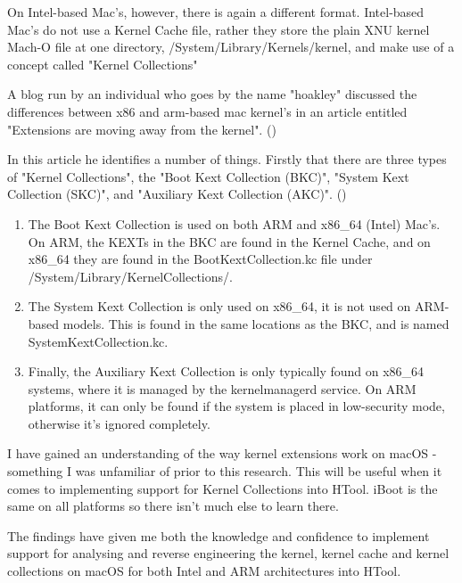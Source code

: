 On Intel-based Mac's, however, there is again a different format. Intel-based Mac's do not use a Kernel Cache file, rather they store the plain XNU kernel Mach-O file at one directory, /System/Library/Kernels/kernel, and make use of a concept called "Kernel Collections"

A blog run by an individual who goes by the name "hoakley" discussed the differences between x86 and arm-based mac kernel's in an article entitled "Extensions are moving away from the kernel". (\cite{hoakley-extensions-kernel})

In this article he identifies a number of things. Firstly that there are three types of "Kernel Collections", the "Boot Kext Collection (BKC)", "System Kext Collection (SKC)", and "Auxiliary Kext Collection (AKC)". (\cite{hoakley-extensions-kernel})

\begin{enumerate}
	\item The Boot Kext Collection is used on both ARM and x86\_64 (Intel) Mac's. On ARM, the KEXTs in the BKC are found in the Kernel Cache, and on x86\_64 they are found in the BootKextCollection.kc file under /System/Library/KernelCollections/.
	\item The System Kext Collection is only used on x86\_64, it is not used on ARM-based models. This is found in the same locations as the BKC, and is named SystemKextCollection.kc.
	\item Finally, the Auxiliary Kext Collection is only typically found on x86\_64 systems, where it is managed by the kernelmanagerd service. On ARM platforms, it can only be found if the system is placed in low-security mode, otherwise it's ignored completely.
\end{enumerate}



I have gained an understanding of the way kernel extensions work on macOS - something I was unfamiliar of prior to this research. This will be useful when it comes to implementing support for Kernel Collections into HTool. iBoot is the same on all platforms so there isn't much else to learn there.


The findings have given me both the knowledge and confidence to implement support for analysing and reverse engineering the kernel, kernel cache and kernel collections on macOS for both Intel and ARM architectures into HTool. 

